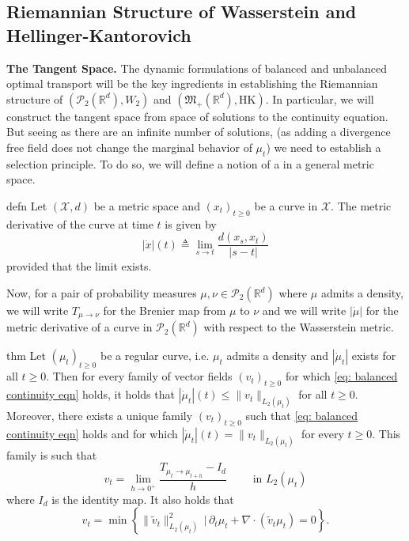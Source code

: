 \documentclass[11pt]{article}
\begin{document}
\subsection{Riemannian Structure of Wasserstein and Hellinger-Kantorovich}

\noindent \textbf{The Tangent Space.} The dynamic formulations of balanced and unbalanced optimal transport will be the key ingredients in establishing the Riemannian structure of $(\mathcal{P}_2(\mathbb{R}^d), W_2)$ and $(\mathfrak{M}_+(\mathbb{R}^d), \text{HK})$. In particular, we will construct the tangent space from space of solutions to the continuity equation. But seeing as there are an infinite number of solutions, (as adding a divergence free field does not change the marginal behavior of $\mu_t$) we need to establish a selection principle. To do so, we will define a notion of a  in a general metric space.

\begin{restatable}{defn}{}
    Let $(\mathcal{X}, d)$ be a metric space and $(x_t)_{t \geq 0}$ be a curve in $\mathcal{X}$. The metric derivative of the curve at time $t$ is given by
    \begin{equation*}
        |\dot x|(t) \triangleq \lim_{s\rightarrow t}\frac{d(x_s, x_t)}{|s - t|}
    \end{equation*}
    provided that the limit exists. 
\end{restatable}

Now, for a pair of probability measures $\mu, \nu \in \mathcal{P}_{2}(\mathbb{R}^d)$ where $\mu$ admits a density, we will write $T_{\mu \rightarrow \nu}$ for the Brenier map from $\mu$ to $\nu$ and we will write $|\dot \mu|$ for the metric derivative of a curve in $\mathcal{P}_{2}(\mathbb{R}^d)$ with respect to the Wasserstein metric.

\begin{restatable}{thm}{}
    Let $(\mu_t)_{t\geq 0}$ be a regular curve, i.e. $\mu_t$ admits a density and $|\dot \mu_t|$ exists for all $t \geq 0$. Then for every family of vector fields $(v_t)_{t\geq 0}$ for which \cref{eq: balanced continuity eqn} holds, it holds that $|\dot \mu_t|(t) \leq \|v_t\|_{L_2(\mu_t)}$ for all $t \geq 0$. Moreover, there exists a unique family $(v_t)_{t\geq 0}$ such that \cref{eq: balanced continuity eqn} holds and for which $|\dot \mu_t|(t) = \|v_t\|_{L_2(\mu_t)}$ for every $t \geq 0$. This family is such that
    \begin{equation*}
        v_t = \lim_{h \rightarrow0^+}\frac{T_{\mu_t\rightarrow \mu_{t+h}}- I_d}{h} \qquad \text{ in $L_2(\mu_t)$}
    \end{equation*}
    where $I_d$ is the identity map. It also holds that 
    \begin{equation*}
        v_t = \min \left\{\|\tilde{v}_t\|_{L_2(\mu_t)}^2 \, \Big|\, \partial_t\mu_t + \nabla \cdot (\tilde v_t\mu_t) = 0\right\}.
    \end{equation*}
\end{restatable}
\end{document}
